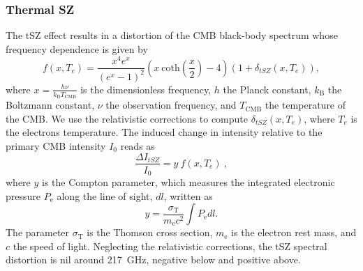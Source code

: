\documentclass[twocolumn,traditabstract]{aa}
\begin{document}
\subsubsection{Thermal SZ}\label{sec:tsz}
The tSZ effect results in a distortion of the CMB black-body spectrum whose frequency dependence is given by \citep{birkinshaw1999}
\begin{equation}
	f(x, T_e) = \frac{x^4 e^x}{\left(e^x-1\right)^2} \left(x  \ \mathrm{coth}\left(\frac{x}{2}\right) - 4\right) \left( 1 + \delta_{tSZ}(x, T_e) \right), 
	\label{eq:sz_f_x}
\end{equation}
where $x = \frac{h \nu}{k_{\mathrm{B}} T_{\mathrm{CMB}}}$ is the dimensionless frequency, $h$ the Planck constant, $k_{\mathrm{B}}$ the Boltzmann constant, $\nu$ the observation frequency, and $T_{\mathrm{CMB}}$ the temperature of the CMB. We use the \cite{itoh1998} relativistic corrections to compute $\delta_{tSZ}(x, T_e)$, where $T_e$ is the electrons temperature. The induced change in intensity relative to the primary CMB intensity $I_0$ reads as
\begin{equation}
	\frac{\Delta I_{tSZ}}{I_0} = y \ f(x, T_e) \ ,
\label{eq:deltaI}
\end{equation}
 where $y$ is the Compton parameter, which measures the integrated electronic pressure $P_{\mathrm{e}}$ along the line of sight, $dl$, written as
   \begin{equation}
	y = \frac{\sigma_{\mathrm{T}}}{m_{\mathrm{e}} c^2} \int P_{\mathrm{e}} dl.
	\label{eq:y_compton}
   \end{equation}
The parameter $\sigma_{\mathrm{T}}$ is the Thomson cross section, $m_{\mathrm{e}}$ is the electron rest mass, and $c$ the speed of light. Neglecting the relativistic corrections, the tSZ spectral distortion is nil around 217~GHz, negative below and positive above.

\end{document}
